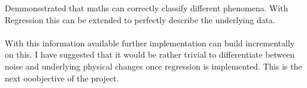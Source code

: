 \documentclass[main.tex]{subfiles}
\begin{document}
  Demmonsstrated that maths can correctly classify different phenomena. With Regression this can be extended to perfectly describe the underlying data.
  \\\\
  With this information available further implementation can build incrementally on this. I have suggested that it would be rather trivial to differentiate between noise and underlying physical changes once regression is implemented. This is the next ooobjective of the project.
\end{document}
